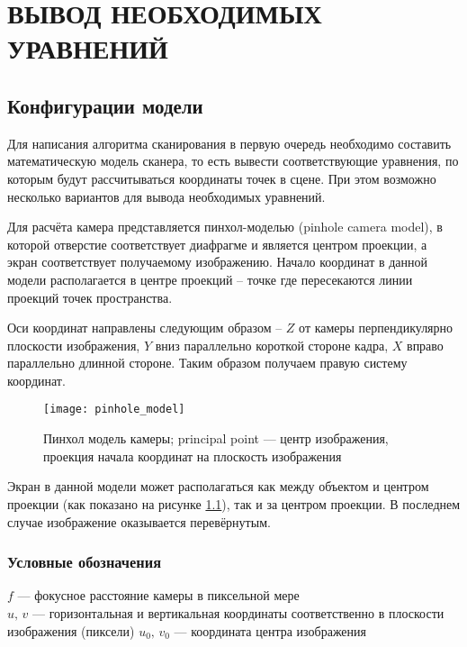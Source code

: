 \chapter{ВЫВОД НЕОБХОДИМЫХ УРАВНЕНИЙ}\label{chap:math}
    \section{Конфигурации модели}
        Для написания алгоритма сканирования в первую очередь необходимо составить математическую модель сканера, то есть вывести соответствующие уравнения, по которым будут рассчитываться координаты точек в сцене. При этом возможно несколько вариантов для вывода необходимых уравнений.
        
        Для расчёта камера представляется пинхол-моделью (pinhole camera model), в которой отверстие соответствует диафрагме и является центром проекции, а экран соответствует получаемому изображению. Начало координат в данной модели располагается в центре проекций -- точке где пересекаются линии проекций точек пространства.
        
        Оси координат направлены следующим образом -- $ Z $ от камеры перпендикулярно плоскости изображения, $ Y $ вниз параллельно короткой стороне кадра, $ X $ вправо параллельно длинной стороне. Таким образом получаем правую систему координат.
        
        \begin{figure}[H]
            \centering
            \texttt{[image: pinhole\_model]}
            \caption{Пинхол модель камеры; principal point --- центр изображения, проекция начала координат на плоскость изображения}\label{pic:pinhole_model}
        \end{figure}

        Экран в данной модели может располагаться как между объектом и центром проекции (как показано на рисунке \ref{pic:pinhole_model}), так и за центром проекции. В последнем случае изображение оказывается перевёрнутым.

        \subsection{Условные обозначения}
            $ f $ --- фокусное расстояние камеры в пиксельной мере\\
            $ u,\,v $ --- горизонтальная и вертикальная координаты соответственно в плоскости изображения (пиксели) 
            $ u_0,\,v_0 $ --- координата центра изображения
            
